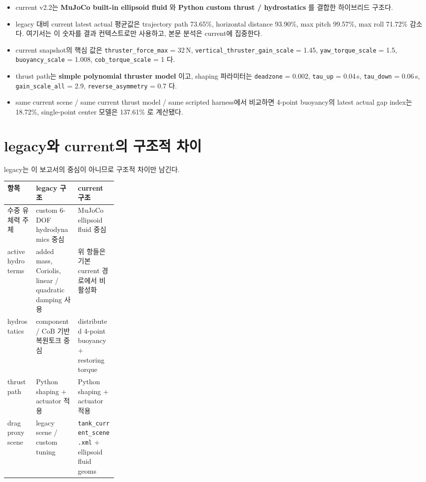 \documentclass[11pt,a4paper]{article}
\newcommand{\code}[1]{\nolinkurl{#1}}
\begin{document}
\begin{itemize}[leftmargin=2em]
  \item current v2.2는 \textbf{MuJoCo built-in ellipsoid fluid} 와 \textbf{Python custom thrust / hydrostatics} 를 결합한 하이브리드 구조다.
  \item legacy 대비 current latest actual 평균값은 trajectory path 73.65\%, horizontal distance 93.90\%, max pitch 99.57\%, max roll 71.72\% 감소다. 여기서는 이 숫자를 결과 컨텍스트로만 사용하고, 본문 분석은 current에 집중한다.
  \item current snapshot의 핵심 값은 \code{thruster\_force\_max} = 32\,N, \code{vertical\_thruster\_gain\_scale} = 1.45, \code{yaw\_torque\_scale} = 1.5, \code{buoyancy\_scale} = 1.008, \code{cob\_torque\_scale} = 1 다.
  \item thrust path는 \textbf{simple polynomial thruster model} 이고, shaping 파라미터는 \code{deadzone} = 0.002, \code{tau\_up} = 0.04\,s, \code{tau\_down} = 0.06\,s, \code{gain\_scale\_all} = 2.9, \code{reverse\_asymmetry} = 0.7 다.
  \item same current scene / same current thrust model / same scripted harness에서 비교하면 4-point buoyancy의 latest actual gap index는 18.72\%, single-point center 모델은 137.61\% 로 계산됐다.
\end{itemize}

\section{legacy와 current의 구조적 차이}

legacy는 이 보고서의 중심이 아니므로 구조적 차이만 남긴다.

\begin{center}
\small
\begin{tabularx}{\linewidth}{>{\raggedright\arraybackslash}p{0.26\linewidth}YY}
\toprule
항목 & legacy 구조 & current 구조 \\
\midrule
수중 유체력 주체 & custom 6-DOF hydrodynamics 중심 & MuJoCo ellipsoid fluid 중심 \\
active hydro terms & added mass, Coriolis, linear / quadratic damping 사용 & 위 항들은 기본 current 경로에서 비활성화 \\
hydrostatics & component / CoB 기반 복원토크 중심 & distributed 4-point buoyancy + restoring torque \\
thrust path & Python shaping + actuator 적용 & Python shaping + actuator 적용 \\
drag proxy scene & legacy scene / custom tuning & \code{tank\_current\_scene.xml} + ellipsoid fluid geoms \\
\bottomrule
\end{tabularx}
\end{center}
\end{document}
